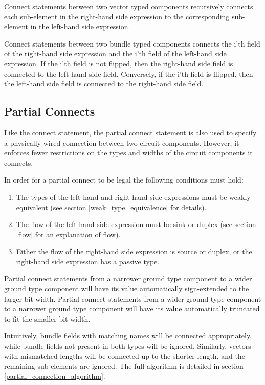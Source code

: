 \documentclass[12pt]{article}
\begin{document}
Connect statements between two vector typed components recursively connects each sub-element in the right-hand side expression to the corresponding sub-element in the left-hand side expression.

Connect statements between two bundle typed components connects the i'th field of the right-hand side expression and the i'th field of the left-hand side expression. If the i'th field is not flipped, then the right-hand side field is connected to the left-hand side field. Conversely, if the i'th field is flipped, then the left-hand side field is connected to the right-hand side field.

\subsection{Partial Connects}\label{partial_connects}
Like the connect statement, the partial connect statement is also used to specify a physically wired connection between two circuit components. However, it enforces fewer restrictions on the types and widths of the circuit components it connects.

In order for a partial connect to be legal the following conditions must hold:
\begin{enumerate}
\item The types of the left-hand and right-hand side expressions must be weakly equivalent (see section \ref{weak_type_equivalence} for details).
\item The flow of the left-hand side expression must be sink or duplex (see section \ref{flow} for an explanation of flow).
\item Either the flow of the right-hand side expression is source or duplex, or the right-hand side expression has a passive type.
\end{enumerate}

Partial connect statements from a narrower ground type component to a wider ground type component will have its value automatically sign-extended to the larger bit width. Partial connect statements from a wider ground type component to a narrower ground type component will have its value automatically truncated to fit the smaller bit width.

Intuitively, bundle fields with matching names will be connected appropriately, while bundle fields not present in both types will be ignored. Similarly, vectors with mismatched lengths will be connected up to the shorter length, and the remaining sub-elements are ignored. The full algorithm is detailed in section \ref{partial_connection_algorithm}.
\end{document}
